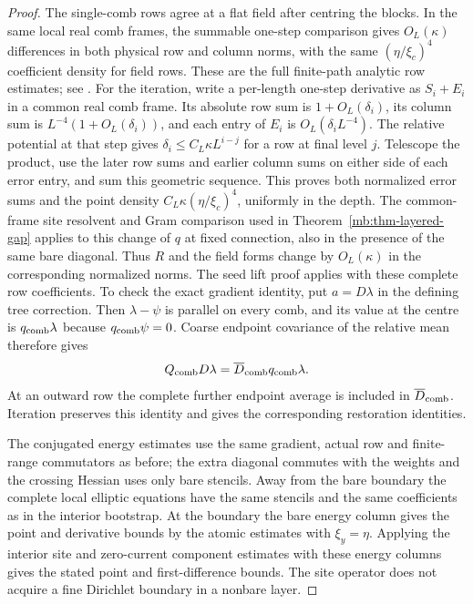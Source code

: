 \documentclass[11pt,letterpaper,reqno]{amsart}
\numberwithin{equation}{section}
\theoremstyle{definition}
\theoremstyle{remark}
\begin{document}
\begin{proof}
The single-comb rows agree at a flat field after
centring the blocks. In the same local real comb frames,
the summable one-step comparison gives \(O_L(\kappa)\)
differences in both physical row and column norms, with
the same $(\eta/\xi_c)^4$ coefficient density for field
rows. These are the full finite-path analytic row estimates;
see \cite[eqs.~(139)--(147), pp.~39--40; Proposition~7, p.~43]{Bal85a}.
For the iteration, write a per-length one-step derivative as
$S_i+E_i$ in a common real comb frame. Its absolute row
sum is $1+O_L(\delta_i)$, its column sum is
$L^{-4}(1+O_L(\delta_i))$, and each entry of $E_i$ is
$O_L(\delta_i L^{-4})$. The relative potential at that
step gives $\delta_i\le C_L\kappa L^{i-j}$ for a row
at final level $j$. Telescope the product, use the later
row sums and earlier column sums on either side of each
error entry, and sum this geometric sequence. This proves
both normalized error sums and the point density
$C_L\kappa(\eta/\xi_c)^4$, uniformly in the depth.
The common-frame site resolvent and Gram comparison
used in Theorem~\ref{mb:thm-layered-gap} applies to this
change of \(q\) at fixed connection, also in the presence
of the same bare diagonal. Thus \(R\) and the field
forms change by \(O_L(\kappa)\) in the corresponding
normalized norms. The seed lift proof applies with these complete row
coefficients. To check the exact gradient identity, put
$a=D\lambda$ in the defining tree correction. Then
$\lambda-\psi$ is parallel on every comb, and its value
at the centre is $q_{\rm comb}\lambda$ because
$q_{\rm comb}\psi=0$. Coarse endpoint covariance of the
relative mean therefore gives
\[
 Q_{\rm comb}D\lambda=
       \overline D_{\rm comb}q_{\rm comb}\lambda.
\]
At an outward row the complete further endpoint average
is included in $\overline D_{\rm comb}$. Iteration preserves
this identity and gives the corresponding restoration identities.

The conjugated energy estimates use the same gradient,
actual row and finite-range commutators as before;
the extra diagonal commutes with the weights and the
crossing Hessian uses only bare stencils. Away from the
bare boundary the complete local elliptic equations have
the same stencils and the same coefficients as in the
interior bootstrap. At the boundary the bare energy
column gives the point and derivative bounds by the
atomic estimates with \(\xi_y=\eta\). Applying the
interior site and zero-current component estimates with
these energy columns gives the stated point and
first-difference bounds. The site operator does not
acquire a fine Dirichlet boundary in a nonbare layer.
\end{proof}
\end{document}
